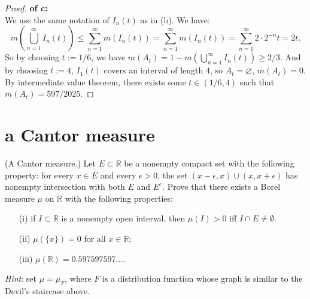 \documentclass[lang=cn,11pt]{elegantbook}
\begin{document}
\begin{proof}
 \textbf{   of c:\\}
 We use the same notation of $I_n(t)$ as in (b). We have:
 $$
 m(\bigcup_{n=1}^\infty I_n(t) )  \leq  \sum_{n=1}^\infty m(I_n(t)) = \sum_{n=1}^\infty m(I_n(t)) =  \sum_{n=1}^\infty2\cdot 2^{-n} t = 2t.
 $$
 So by choosing $t:= 1/6$, we have $m(A_t) = 1 -  m(\bigcup_{n=1}^\infty I_n(t) ) \geq 2/3$.
 And by choosing $t:= 4$, $I_1(t)$ covers an interval of length $4$, so $A_t = \varnothing$, $m(A_t) = 0$.
 By intermediate value theorem, there exists some $t \in(1/6, 4)$ such that $m(A_t)=597/2025$.
\end{proof}


\section{a Cantor measure}
  (A Cantor measure.)
  Let $E\subset \mathbb{R}$ be a nonempty compact set with the following property: for every $x\in E$ and every $\epsilon>0$, the set $(x-\epsilon,x)\cup(x,x+\epsilon)$ has nonempty intersection with both $E$ and $E^c$. Prove that there exists a Borel measure $\mu$ on $\mathbb{R}$ with the following properties:
  \begin{itemize}
  \item[(i)]
    if $I\subset \mathbb{R}$ is a nonempty open interval, then $\mu(I)>0$ iff $I\cap E\ne\emptyset$.
  \item[(ii)]
    $\mu(\{x\})=0$ for all $x\in\mathbb{R}$; 
  \item[(iii)]
    $\mu(\mathbb{R})=0.597597597\dots$.
  \end{itemize}
  \textit{Hint}: set $\mu=\mu_F$, where $F$ is a distribution function whose graph is similar to the Devil's staircase above.
 
\end{document}
